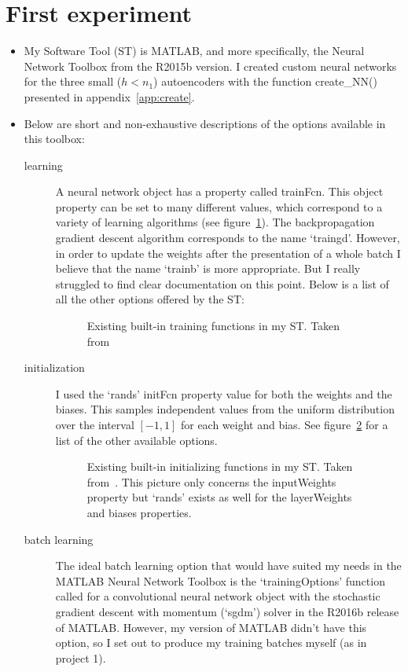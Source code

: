 \documentclass{article}
\begin{document}
\section{First experiment}
\begin{itemize}
\item My {\color{blue}Software Tool (}ST{\color{blue})} is MATLAB, and more specifically, the Neural Network Toolbox from the R2015b version. I created custom neural networks for the three small {\color{blue}($h<n_1$)} autoencoders with the function create\_NN() presented in appendix~\ref{app:create}.
\item {\color{blue}Below} are short and non-exhaustive descriptions of the options available in this toolbox:
\begin{description}
\item[learning] A neural network object has a property called trainFcn. This object property can be set to many 
different values, which correspond to a variety of learning algorithms {\color{blue}(see figure~\ref{fig:trainFcn})}. The backpropagation gradient descent
algorithm corresponds to the name `traingd'. However, in order to update the weights after the presentation of a whole batch I believe that the name `trainb' is more appropriate. But I really struggled to find clear documentation on this
point. Below is a list of all the other options offered by the ST:
\begin{figure}[bth!]
\centering
{}
\caption{Existing built-in training functions in my ST. Taken from~\cite{Demuth2006}}\label{fig:trainFcn}
\end{figure}
\item[initialization] I used the `rands' initFcn property value for both the weights and the biases. This samples 
independent values from the uniform distribution over the interval $[-1,1]$ for each weight and bias. {\color{blue}See figure~\ref{fig:initFcn} for a list of the other available options.}
\begin{figure}[bth!]
\centering
{}
\caption{Existing built-in initializing functions in my ST. Taken from~\cite{Demuth2006}. This picture only concerns the inputWeights property but `rands' exists as well for the layerWeights and biases properties.}\label{fig:initFcn}
\end{figure}
\item[batch learning] The ideal batch learning option that would have suited my needs in the MATLAB Neural Network Toolbox is the `trainingOptions' function called for a convolutional neural network object with the stochastic gradient descent with momentum (`sgdm') solver in the R2016b release of MATLAB. However, my version of MATLAB didn't have this option,
so I set out to produce my training batches myself (as in project 1).


\end{description}
\end{itemize}
\end{document}
